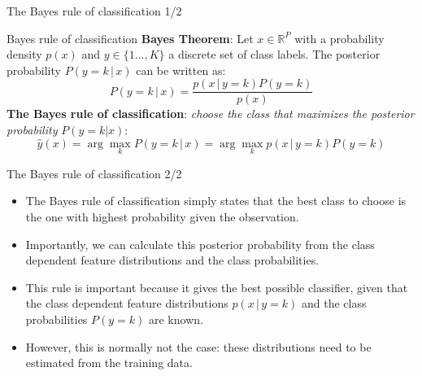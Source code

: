 \documentclass[xcolor=pdftex,dvipsnames,table]{beamer}
\begin{document}

\begin{frame}{The Bayes rule of classification 1/2}

\begin{block}{Bayes rule of classification}
	\textbf{Bayes Theorem}: Let $x \in \mathbb{R}^P$ with a probability density $p(x)$ and $y \in \{1 \ldots, K\}$ a discrete set of class labels. The posterior probability $P(y=k\,|\,x)$ can be written as:
	\begin{equation}
		P(y=k \, | \, x) = \frac{p(x \, | \, y=k) P(y=k)}{p(x)}
	\end{equation}
	\textbf{The Bayes rule of classification}: \emph{choose the class that maximizes the posterior probability} $P(y=k|x)$:
	\begin{equation}\label{equ:bayes_rule}
		\hat{y}(x) = \arg\max_k P(y=k \, | \, x) = \arg\max_k p(x\,|\,y=k)P(y=k)
	\end{equation}
\end{block}

\end{frame}


\begin{frame}{The Bayes rule of classification 2/2}
\begin{itemize}
\item The Bayes rule of classification simply states that the best class to choose is the one with highest probability given the observation.
\item Importantly, we can calculate this posterior probability from the class dependent feature distributions and the class probabilities.
\item This rule is important because it gives the best possible classifier, given that the class dependent feature distributions $p(x\,|\,y=k)$ and the class probabilities $P(y=k)$ are known.
\item However, this is normally not the case: these distributions need to be estimated from the training data.
\end{itemize}
\end{frame}


\end{document}
